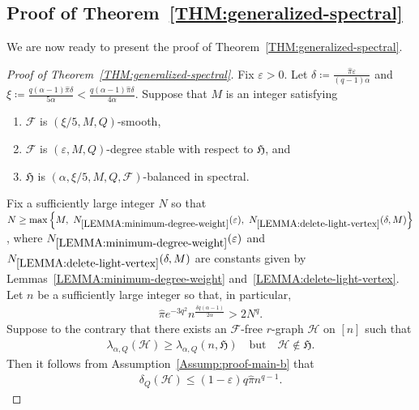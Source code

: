 \documentclass[11pt,a4paper]{article}
\begin{document}
\subsection{Proof of Theorem~\ref{THM:generalized-spectral}}\label{SUBSEC:Proof-generlized-spectral}
%
We are now ready to present the proof of Theorem~\ref{THM:generalized-spectral}.
%
\begin{proof}[Proof of Theorem~\ref{THM:generalized-spectral}] 
    Fix $\varepsilon > 0$. Let $\delta \coloneqq  \frac{\hat{\pi} \varepsilon}{(q-1)\alpha}$ and $\xi \coloneqq \frac{q(\alpha-1) \hat{\pi} \delta}{5 \alpha} < \frac{q(\alpha-1) \hat{\pi} \delta}{4 \alpha}$. 
    Suppose that $M$ is an integer satisfying 
    \begin{enumerate}[label=(\roman*)]
        \item\label{Assump:proof-main-a} $\mathcal{F}$ is $(\xi/5, M, Q)$-smooth,
        \item\label{Assump:proof-main-b} $\mathcal{F}$ is $(\varepsilon, M, Q)$-degree stable with respect to $\mathfrak{H}$, and 
        \item\label{Assump:proof-main-c} $\mathfrak{H}$ is $(\alpha, \xi/5, M, Q, \mathcal{F})$-balanced in spectral. 
    \end{enumerate}
    Fix a sufficiently large integer $N$ so that $N \ge \max\left\{M,~N_{\ref{LEMMA:minimum-degree-weight}}(\varepsilon),~N_{\ref{LEMMA:delete-light-vertex}}(\delta, M)\right\}$, where $N_{\ref{LEMMA:minimum-degree-weight}}(\varepsilon)$ and $N_{\ref{LEMMA:delete-light-vertex}}(\delta, M)$ are constants given by Lemmas~\ref{LEMMA:minimum-degree-weight} and~\ref{LEMMA:delete-light-vertex}. 
    Let $n$ be a sufficiently large integer so that, in particular, 
    \begin{align}\label{equ:n-lower-bound}
        \hat{\pi} e^{-3q^2} n^{\frac{\delta q (\alpha-1)}{2\alpha}} > 2 N^{q}.
    \end{align}
    Suppose to the contrary that there exists an $\mathcal{F}$-free $r$-graph $\mathcal{H}$ on $[n]$ such that 
    \begin{align*}
        \lambda_{\alpha,Q}(\mathcal{H})
        \ge \lambda_{\alpha, Q}(n,\mathfrak{H})
        \quad\text{but}\quad 
        \mathcal{H} \not\in \mathfrak{H}.
    \end{align*}
    Then it follows from Assumption~\ref{Assump:proof-main-b} that 
    \begin{align}\label{equ:min-Q-degree-Hn}
        \delta_{Q}(\mathcal{H})
        \le (1-\varepsilon) q \hat{\pi}  n^{q-1}. 

\end{align}
\end{proof}
\end{document}
